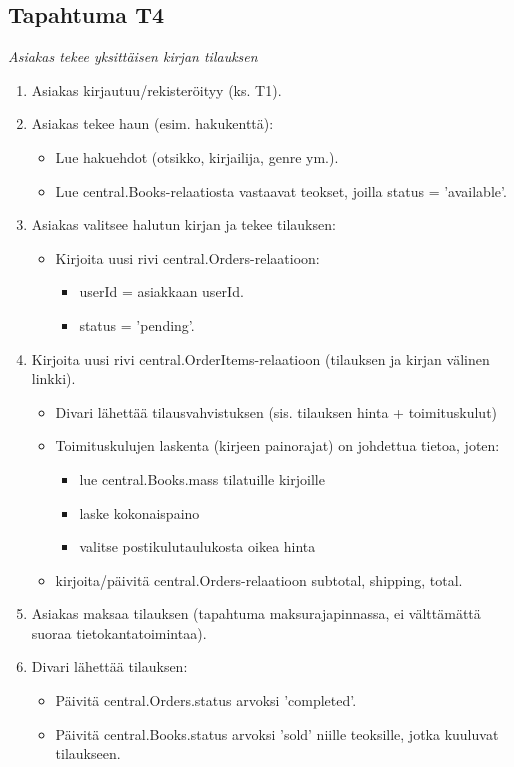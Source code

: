 \documentclass[11pt,a4paper]{article}
\begin{document}
\subsection{Tapahtuma T4}
{\large{\textit{Asiakas tekee yksittäisen kirjan tilauksen}}}

\begin{enumerate}
	\item Asiakas kirjautuu/rekisteröityy (ks. T1).
	\item Asiakas tekee haun (esim. hakukenttä):
	      \begin{itemize}
		      \item Lue hakuehdot (otsikko, kirjailija, genre ym.).
		      \item Lue central.Books-relaatiosta vastaavat teokset, joilla status = 'available'.
	      \end{itemize}
	\item Asiakas valitsee halutun kirjan ja tekee tilauksen:
	      \begin{itemize}
		      \item Kirjoita uusi rivi central.Orders-relaatioon:
		            \begin{itemize}
			            \item userId = asiakkaan userId.
			            \item status = 'pending'.
		            \end{itemize}
	      \end{itemize}
	\item Kirjoita uusi rivi central.OrderItems-relaatioon (tilauksen ja kirjan välinen linkki).
	      \begin{itemize}
		      \item Divari lähettää tilausvahvistuksen (sis. tilauksen hinta + toimituskulut)
		      \item Toimituskulujen laskenta (kirjeen painorajat) on johdettua tietoa, joten:
		            \begin{itemize}
			            \item lue central.Books.mass tilatuille kirjoille
			            \item laske kokonaispaino
			            \item valitse postikulutaulukosta oikea hinta
		            \end{itemize}
		      \item kirjoita/päivitä central.Orders-relaatioon subtotal, shipping, total.
	      \end{itemize}
	\item Asiakas maksaa tilauksen (tapahtuma maksurajapinnassa, ei välttämättä suoraa tietokantatoimintaa).
	\item Divari lähettää tilauksen:
	      \begin{itemize}
		      \item Päivitä central.Orders.status arvoksi 'completed'.
		      \item Päivitä central.Books.status arvoksi 'sold' niille teoksille, jotka kuuluvat tilaukseen.
	      \end{itemize}
\end{enumerate}
\end{document}
